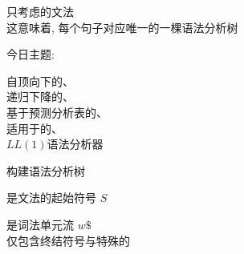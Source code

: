 
\begin{frame}{}
  \begin{center}
    只考虑的文法 \\[4pt]
    这意味着, 每个句子对应唯一的一棵语法分析树


    今日主题: 
  \end{center}
\end{frame}

\begin{frame}{}

\end{frame}

\begin{frame}{}
  \begin{center}
    自顶向下的、\\[15pt]
    递归下降的、\\[15pt]
    基于预测分析表的、\\[15pt]
    适用于的、\\[15pt]
    $LL(1)$语法分析器
  \end{center}
\end{frame}

\begin{frame}{}
  \begin{center}
    {\large {}构建语法分析树}

    \vspace{0.60cm}
    是文法的起始符号 $S$


    \vspace{0.80cm}
    是词法单元流 $w\$$ \\[8pt]
    仅包含终结符号与特殊的
  \end{center}
\end{frame}


